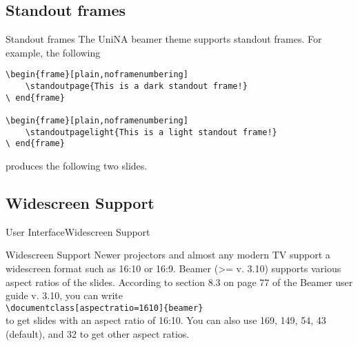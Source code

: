 \documentclass[10pt,aspectratio=43
	]{beamer}
\begin{document}
\subsection{Standout frames}


\begin{frame}[fragile]{Standout frames}{}
	The UniNA beamer theme supports standout frames. For example, the following
	\begin{verbatim}
\begin{frame}[plain,noframenumbering]
	\standoutpage{This is a dark standout frame!}
\ end{frame}

\begin{frame}[plain,noframenumbering]
	\standoutpagelight{This is a light standout frame!}
\ end{frame}
	\end{verbatim}
	produces the following two slides.
\end{frame}

\begin{frame}
\end{frame}

\begin{frame}
\end{frame}

\subsection{Widescreen Support}
\begin{frame}{User Interface}{Widescreen Support}
\begin{block}{Widescreen Support}
	Newer projectors and almost any modern TV support a widescreen format such as 16:10 or 16:9. Beamer (>= v. 3.10) supports various aspect ratios of the slides. According to section 8.3 on page 77 of the Beamer user guide v. 3.10, you can write\\
{\tt\textbackslash documentclass[aspectratio=1610]\{beamer\}}\\
to get slides with an aspect ratio of 16:10. You can also use 169, 149, 54, 43 (default), and 32 to get other aspect ratios.
\end{block}
\end{frame}
\end{document}
